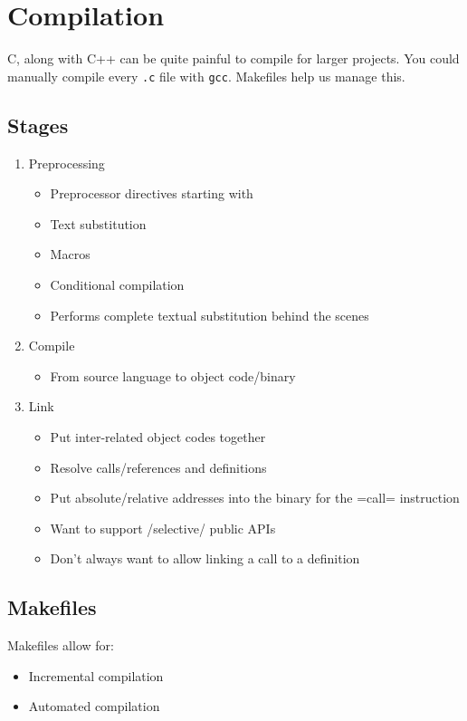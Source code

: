 \section{Compilation}\label{sec:Compilation}
C, along with C++ can be quite painful to compile for larger projects.
You could manually compile every \texttt{.c} file with \texttt{gcc}.
Makefiles help us manage this.

\subsection{Stages}\label{subsec:Compilation_Stages}
\begin{enumerate}[noitemsep]
\item Preprocessing
  \begin{itemize}[noitemsep]
  \item Preprocessor directives starting with \cinline{#}
  \item Text substitution
  \item Macros
  \item Conditional compilation
  \item Performs complete textual substitution behind the scenes
  \end{itemize}
\item Compile
  \begin{itemize}[noitemsep]
  \item From source language to object code/binary
  \end{itemize}
\item Link
  \begin{itemize}[noitemsep]
  \item Put inter-related object codes together
  \item Resolve calls/references and definitions
  \item Put absolute/relative addresses into the binary for the =call= instruction
  \item Want to support /selective/ public APIs
  \item Don't always want to allow linking a call to a definition
  \end{itemize}
\end{enumerate}

\subsection{Makefiles}\label{subsec:Makefiles}
Makefiles allow for:
\begin{itemize}[noitemsep]
\item Incremental compilation
\item Automated compilation
\end{itemize}


